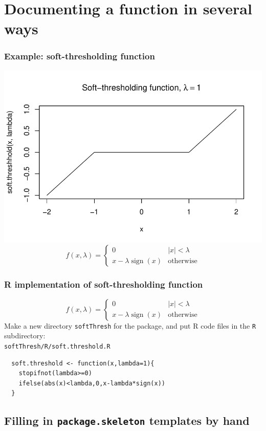 \documentclass{beamer}
\begin{document}
\section{Documenting a function in several ways}

\begin{frame}\frametitle{Example: soft-thresholding function}
  \includegraphics[width=\textwidth]{soft-thresh}
  $$f(x,\lambda)=\begin{cases}
    0 & |x|<\lambda\\
    x-\lambda\operatorname{sign}(x) & \text{otherwise}
  \end{cases}$$
\end{frame}

\begin{frame}[containsverbatim]
  \frametitle{R implementation of soft-thresholding function}
    $$f(x,\lambda)=\begin{cases}
    0 & |x|<\lambda\\
    x-\lambda\operatorname{sign}(x) & \text{otherwise}
  \end{cases}$$
  Make a new directory \texttt{softThresh} for the package,
  and put R code files in the \texttt{R} subdirectory:\\
    \texttt{softThresh/R/soft.threshold.R}
    \hrulefill
  \begin{verbatim}
  soft.threshold <- function(x,lambda=1){
    stopifnot(lambda>=0)
    ifelse(abs(x)<lambda,0,x-lambda*sign(x))
  }
  \end{verbatim}
\end{frame}

\subsection{Filling in \texttt{package.skeleton} templates by hand}
\end{document}
